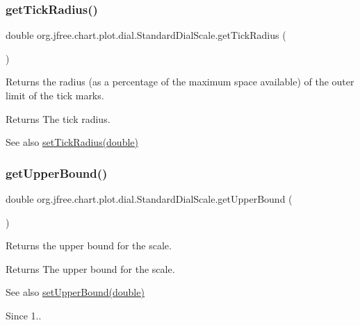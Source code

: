 \subsubsection{\texorpdfstring{get\+Tick\+Radius()}{getTickRadius()}}
{\footnotesize\ttfamily double org.\+jfree.\+chart.\+plot.\+dial.\+Standard\+Dial\+Scale.\+get\+Tick\+Radius (\begin{DoxyParamCaption}{ }\end{DoxyParamCaption})}

Returns the radius (as a percentage of the maximum space available) of the outer limit of the tick marks.

\begin{DoxyReturn}{Returns}
The tick radius.
\end{DoxyReturn}
\begin{DoxySeeAlso}{See also}
\mbox{\hyperlink{classorg_1_1jfree_1_1chart_1_1plot_1_1dial_1_1_standard_dial_scale_aeb6083a6e71773a81579db3412a73a9b}{set\+Tick\+Radius(double)}} 
\end{DoxySeeAlso}
\mbox{\label{classorg_1_1jfree_1_1chart_1_1plot_1_1dial_1_1_standard_dial_scale_aac8a93d9053c13224408742acfd00e08}} 
\subsubsection{\texorpdfstring{get\+Upper\+Bound()}{getUpperBound()}}
{\footnotesize\ttfamily double org.\+jfree.\+chart.\+plot.\+dial.\+Standard\+Dial\+Scale.\+get\+Upper\+Bound (\begin{DoxyParamCaption}{ }\end{DoxyParamCaption})}

Returns the upper bound for the scale.

\begin{DoxyReturn}{Returns}
The upper bound for the scale.
\end{DoxyReturn}
\begin{DoxySeeAlso}{See also}
\mbox{\hyperlink{classorg_1_1jfree_1_1chart_1_1plot_1_1dial_1_1_standard_dial_scale_ae26419137b686bc872cc0c78f8c17c3d}{set\+Upper\+Bound(double)}}
\end{DoxySeeAlso}
\begin{DoxySince}{Since}
1.. 
\end{DoxySince}
\mbox{\label{classorg_1_1jfree_1_1chart_1_1plot_1_1dial_1_1_standard_dial_scale_a388a742872c946d4fa5ca8400c9cf008}} 
